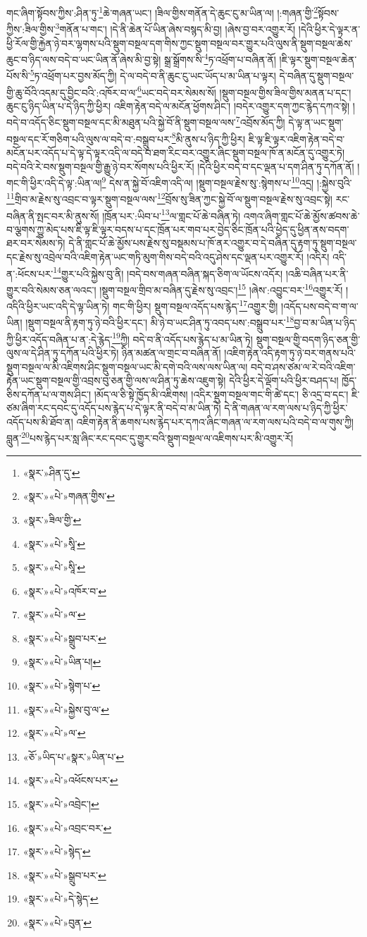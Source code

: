 གང་ཞིག་སྟོབས་ཀྱིས་:ཤིན་ཏུ་\footnote{«སྣར་»ཤིན་དུ་}ཆེ་གཞན་ཡང་། །ཟིལ་གྱིས་གནོན་དེ་ཆུང་ངུ་མ་ཡིན་ལ། །:གཞན་གྱི་\footnote{«སྣར་»«པེ་»གཞན་གྱིས་}སྟོབས་ཀྱིས་:ཟིལ་གྱིས་\footnote{«སྣར་»ཟིལ་གྱི་}གནོན་པ་གང་། །དེ་ནི་ཆེན་པོ་ཡིན་ཞེས་བསྙད་མི་བྱ། །ཞེས་བྱ་བར་འགྱུར་རོ། །དེའི་ཕྱིར་དེ་ལྟར་ན་ཕྱི་རོལ་གྱི་རྐྱེན་ཉེ་བར་ལྷགས་པའི་སྡུག་བསྔལ་དག་གིས་ཀྱང་སྡུག་བསྔལ་བར་གྱུར་པའི་ལུས་ནི་སྡུག་བསྔལ་ཆེས་ཆུང་བ་ཉིད་ལས་བདེ་བ་ཡང་ཡིན་ནོ་ཞེས་མི་བྱ་སྟེ། སྒྲ་སྒྲོགས་སི་\footnote{«སྣར་»«པེ་»སཱི་}ཏ་འཕྲོག་པ་བཞིན་ནོ། །ཇི་ལྟར་སྡུག་བསྔལ་ཆེན་པོས་སི་\footnote{«སྣར་»«པེ་»སཱི་}ཏ་འཕྲོག་པར་བྱས་མོད་ཀྱི། དེ་ལ་བདེ་བ་ནི་ཆུང་ངུ་ཡང་ཡོད་པ་མ་ཡིན་པ་ལྟར། དེ་བཞིན་དུ་སྡུག་བསྔལ་གྱི་ཆུ་བོའི་འདམ་དུ་བྱིང་བའི་:འཁོར་བ་ལ་\footnote{«སྣར་»«པེ་»འཁོར་བ་}ཡང་བདེ་བར་སེམས་སོ། །སྡུག་བསྔལ་གྱིས་ཟིལ་གྱིས་མནན་པ་དང་། ཆུང་ངུ་ཉིད་ཡིན་པ་དེ་ཉིད་ཀྱི་ཕྱིར། འཇིག་རྟེན་བདེ་ལ་མངོན་ཕྱོགས་ཤིང་། །བདེར་འགྱུར་དག་ཀྱང་རྙེད་དཀའ་སྟེ། །བདེ་བ་འདོད་ཅིང་སྡུག་བསྔལ་དང་མི་མཐུན་པའི་སྐྱེ་བོ་ནི་སྡུག་བསྔལ་ལས་\footnote{«སྣར་»«པེ་»ལ་}འབྲོས་མོད་ཀྱི། དེ་ལྟ་ན་ཡང་སྡུག་བསྔལ་དང་རོ་གཅིག་པའི་ལུས་ལ་བདེ་བ་:བསྒྲུབ་པར་\footnote{«སྣར་»«པེ་»སྒྲུབ་པར་}མི་ནུས་པ་ཉིད་ཀྱི་ཕྱིར། ཇི་ལྟ་ཇི་ལྟར་འཇིག་རྟེན་བདེ་བ་མངོན་པར་འདོད་པ་དེ་ལྟ་དེ་ལྟར་འདི་ལ་བདེ་བ་ཐག་རིང་བར་འགྱུར་ཞིང་སྡུག་བསྔལ་ཁོ་ན་མངོན་དུ་འགྱུར་ཏེ། བདེ་བའི་རེ་བས་སྡུག་བསྔལ་གྱི་རྒྱུ་ཉེ་བར་སོགས་པའི་ཕྱིར་རོ། །དེའི་ཕྱིར་བདེ་བ་དང་ལྡན་པ་དག་ཤིན་ཏུ་དཀོན་ནོ། །གང་གི་ཕྱིར་འདི་དེ་ལྟ་:ཡིན་ལ།\footnote{«སྣར་»«པེ་»ཡིན་པ།} དེས་ན་སྐྱེ་བོ་འཇིག་འདི་ལ། །སྡུག་བསྔལ་རྗེས་སུ་:སྙེགས་པ་\footnote{«སྣར་»«པེ་»སྙེག་པ་}འདྲ། །:སྐྱེས་བུའི་\footnote{«སྣར་»«པེ་»སྐྱེས་བུ་ལ་}གྲིབ་མ་རྗེས་སུ་འབྲང་བ་ལྟར་སྡུག་བསྔལ་ལས་\footnote{«སྣར་»«པེ་»ལ་}བྲོས་སུ་ཟིན་ཀྱང་སྐྱེ་བོ་ལ་སྡུག་བསྔལ་རྗེས་སུ་འབྲང་སྟེ། རང་བཞིན་ནི་སྤང་བར་མི་ནུས་སོ། །ཁྲོན་པར་:ཡིབ་པ་\footnote{«ཅོ་»ཡིད་པ་«སྣར་»ཡིན་པ་}ལ་གླང་པོ་ཆེ་བཞིན་ཏེ། འགའ་ཞིག་གླང་པོ་ཆེ་མྱོས་ཚབས་ཆེ་བ་ལྕགས་ཀྱུ་མེད་པས་ཇི་ལྟ་ཇི་ལྟར་བདས་པ་དང་ཁྲོན་པར་གབ་པར་བྱེད་ཅིང་ཁྲོན་པའི་ཕྱེད་དུ་ཕྱིན་ནས་བདག་ཐར་བར་སེམས་ཏེ། དེ་ནི་གླང་པོ་ཆེ་མྱོས་པས་རྗེས་སུ་བསྡམས་པ་ཁོ་ནར་འགྱུར་བ་དེ་བཞིན་དུ་རྟག་ཏུ་སྡུག་བསྔལ་དང་རྗེས་སུ་འབྲེལ་བའི་འཇིག་རྟེན་ཡང་གཏི་མུག་གིས་བདེ་བའི་འདུ་ཤེས་དང་ལྡན་པར་འགྱུར་རོ། །འདིར། འདི་ན་:ཕོངས་པར་\footnote{«སྣར་»«པེ་»འཕོངས་པར་}གྱུར་པའི་སྐྱེས་བུ་ནི། །བདེ་བས་གཞན་བཞིན་སྐད་ཅིག་ལ་ཡོངས་འདོར། །འཆི་བཞིན་པར་ནི་གྱུར་བའི་སེམས་ཅན་ལའང་། །སྡུག་བསྔལ་གྲིབ་མ་བཞིན་དུ་རྗེས་སུ་འབྲང་།\footnote{«སྣར་»«པེ་»འབྲེང་།} །ཞེས་:འབྱུང་བར་\footnote{«སྣར་»«པེ་»འབྲང་བར་}འགྱུར་རོ། །འདིའི་ཕྱིར་ཡང་འདི་དེ་ལྟ་ཡིན་ཏེ། གང་གི་ཕྱིར། སྡུག་བསྔལ་འདོད་པས་རྙེད་\footnote{«སྣར་»«པེ་»སྙེད་}འགྱུར་གྱི། །འདོད་པས་བདེ་བ་ག་ལ་ཡིན། །སྡུག་བསྔལ་ནི་རྟག་ཏུ་ཉེ་བའི་ཕྱིར་དང་། མི་ཉེ་བ་ཡང་ཤིན་ཏུ་འབད་པས་:བསྒྲུབ་པར་\footnote{«སྣར་»«པེ་»སྒྲུབ་པར་}བྱ་བ་མ་ཡིན་པ་ཉིད་ཀྱི་ཕྱིར་འདོད་བཞིན་པ་ན་:དེ་རྙེད་\footnote{«སྣར་»«པེ་»དེ་སྙེད་}ཀྱི། བདེ་བ་ནི་འདོད་པས་རྙེད་པ་མ་ཡིན་ཏེ། སྡུག་བསྔལ་གྱི་བདག་ཉིད་ཅན་གྱི་ལུས་ལ་དེ་ཤིན་ཏུ་དཀོན་པའི་ཕྱིར་ཏེ། ཉིན་མཚན་ལ་གྲང་བ་བཞིན་ནོ། །འཇིག་རྟེན་འདི་རྟག་ཏུ་ཉེ་བར་གནས་པའི་སྡུག་བསྔལ་ལ་མི་འཇིགས་ཤིང་སྡུག་བསྔལ་ཡང་མི་དགེ་བའི་ལས་ལས་ཡིན་ལ། བདེ་བ་ཤས་ཙམ་ལ་རེ་བའི་འཇིག་རྟེན་ཡང་སྡུག་བསྔལ་གྱི་འབྲས་བུ་ཅན་གྱི་ལས་ལ་ཤིན་ཏུ་ཆེས་འཇུག་སྟེ། དེའི་ཕྱིར་དེ་ལྡོག་པའི་ཕྱིར་བཤད་པ། ཁྱོད་ཅིས་དཀོན་པ་ལ་གུས་ཤིང་། །མོད་ལ་ཅི་སྟེ་ཁྱོད་མི་འཇིགས། །འདིར་སྡུག་བསྔལ་གང་གི་ཚེ་དང་། ཅི་འདྲ་བ་དང་། ཇི་ཙམ་ཞིག་རང་དབང་དུ་འདོད་པས་རྙེད་པ་དེ་ལྟར་ནི་བདེ་བ་མ་ཡིན་ཏེ། དེ་ནི་གཞན་ལ་རག་ལས་པ་ཉིད་ཀྱི་ཕྱིར་འདོད་པས་མི་ཐོབ་ན། འཇིག་རྟེན་ནི་ཆགས་པས་རྙེད་པར་དཀའ་ཞིང་གཞན་ལ་རག་ལས་པའི་བདེ་བ་ལ་གུས་ཀྱི། བླུན་\footnote{«སྣར་»«པེ་»བུན་}པས་རྙེད་པར་སླ་ཞིང་རང་དབང་དུ་གྱུར་བའི་སྡུག་བསྔལ་ལ་འཇིགས་པར་མི་འགྱུར་རོ། 